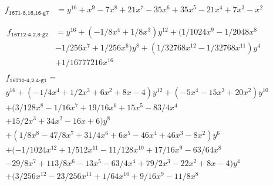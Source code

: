 \documentclass{dcthesis}
\numberwithin{equation}{section}
\theoremstyle{definition}
\theoremstyle{remark}
\begin{document}
{{{    \begin{align}
      \label{eqn:d16t1_81616}
      \begin{split}
        f_{\texttt{16T1-8,16,16-g7}}
        &=y^{16} + x^9 - 7x^8 + 21x^7 - 35x^6 + 35x^5 - 21x^4 + 7x^3 - x^2\\
      \end{split}
    \end{align}
    \begin{align}
      \label{eqn:d16t12_248}
      \begin{split}
        f_{\texttt{16T12-4,2,8-g2}}
        &=y^{16} + (-1/8x^4 + 1/8x^3)y^{12} + (1/1024x^9 - 1/2048x^8\\
        &- 1/256x^7 + 1/256x^6)y^8 + (1/32768x^{12} - 1/32768x^{11})y^4\\
        &+ 1/16777216x^{16}
      \end{split}
    \end{align}
    \begin{align}
      \label{eqn:d16t10_244}
      \begin{split}
        &f_{\texttt{16T10-4,2,4-g1}}=\\
        &y^{16} + (-1/4x^4 + 1/2x^3 + 6x^2 + 8x - 4)y^{12} + (-5x^4 - 15x^3 + 20x^2)y^{10}\\
        &+ (3/128x^8 - 1/16x^7 + 19/16x^6 + 15x^5 - 83/4x^4\\
        &+ 15/2x^3 + 34x^2 - 16x + 6)y^8\\
        &+ (1/8x^8 - 47/8x^7 + 31/4x^6 + 6x^5 - 46x^4 + 46x^3 - 8x^2)y^6\\
        &+ (-1/1024x^{12} + 1/512x^{11} - 11/128x^{10} + 17/16x^9 - 63/64x^8\\
        &- 29/8x^7 + 113/8x^6 - 13x^5 - 63/4x^4 + 79/2x^3 - 22x^2 + 8x - 4)y^4\\
        &+ (3/256x^{12} - 23/256x^{11} + 1/64x^{10} + 9/16x^9 - 11/8x^8\\

\end{split}
\end{align}}}}
\end{document}

